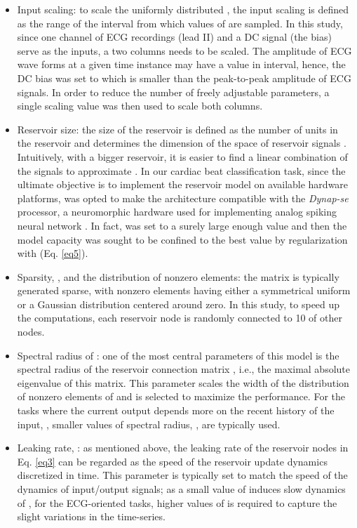 \documentclass[review]{elsarticle}
\begin{document}
\begin{itemize}
  \item Input scaling: to scale the uniformly distributed , the input scaling  is defined as the range of the interval  from which values of  are sampled. In this study, since one channel of ECG recordings (lead II) and a DC signal (the bias) serve as the inputs, a two columns  needs to be scaled. The amplitude of ECG wave forms at a given time instance may have a value in  interval, hence, the DC bias was set to  which is smaller than the peak-to-peak amplitude of ECG signals. In order to reduce the number of freely adjustable parameters, a single scaling value was then used to scale both columns. 
  \\
  \item Reservoir size: the size of the reservoir is defined as the number of units in the reservoir and determines the dimension of the space of reservoir signals . Intuitively, with a bigger reservoir, it is easier to find a linear combination of the signals to approximate . In our cardiac beat classification task, since the ultimate objective is to implement the reservoir model on available hardware platforms,  was opted to make the architecture compatible with the \textit{Dynap-se} processor, a neuromorphic hardware used for implementing analog spiking neural network \cite{moradi2018scalable}. In fact,  was set to a surely large enough value and then the model capacity was sought to be confined to the best value by regularization with  (Eq. \ref{eq5}). 
  \\
  
  \item Sparsity, , and the distribution of nonzero elements: the matrix  is typically generated sparse, with nonzero elements having either a symmetrical uniform or a Gaussian distribution centered around zero. In this study, to speed up the computations, each reservoir node is randomly connected to 10 of other nodes. 
  \\
  \item Spectral radius of : one of the most central parameters of this model is the spectral radius
of the reservoir connection matrix , i.e., the maximal absolute eigenvalue of this matrix. This parameter scales the width of the distribution of nonzero elements of  and is selected to maximize the performance. For the tasks where the current output  depends more on the recent history of the input, , smaller values of spectral radius, , are typically used. 
\\
\item Leaking rate, : as mentioned above, the leaking rate of the reservoir nodes in Eq. \ref{eq3} can be regarded as the speed of the reservoir update dynamics discretized in time. This parameter is typically set to match the speed of the dynamics of input/output signals; as a small value of  induces slow dynamics of , for the ECG-oriented tasks, higher values of  is required to capture the slight variations in the time-series.  
\end{itemize}
\end{document}
